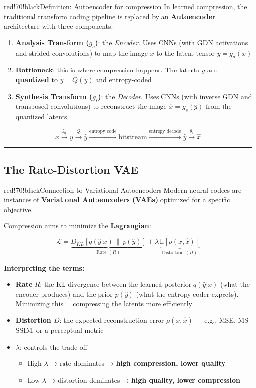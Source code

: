 \begin{calloutbox}{red!70!black}{Definition: Autoencoder for compression}
In learned compression, the traditional transform coding pipeline is replaced by an \textbf{Autoencoder} architecture with three components:

\begin{enumerate}
\item \textbf{Analysis Transform ($g_a$)}: the \textit{Encoder}. Uses CNNs (with GDN activations and strided convolutions) to map the image $x$ to the latent tensor $y = g_a(x)$
\item \textbf{Bottleneck}: this is where compression happens. The latents $y$ are \textbf{quantized} to $\hat{y} = Q(y)$ and entropy-coded
\item \textbf{Synthesis Transform ($g_s$)}: the \textit{Decoder}. Uses CNNs (with inverse GDN and transposed convolutions) to reconstruct the image $\hat{x} = g_s(\hat{y})$ from the quantized latents
\end{enumerate}
\end{calloutbox}

\[
x \xrightarrow{g_a} y \xrightarrow{Q} \hat{y} \xrightarrow{\text{entropy code}} \text{bitstream} \xrightarrow{\text{entropy decode}} \hat{y} \xrightarrow{g_s} \hat{x}
\]

\bigskip\hrule\bigskip

\subsection{The Rate-Distortion VAE}

\begin{calloutbox}{red!70!black}{Connection to Variational Autoencoders}
Modern neural codecs are instances of \textbf{Variational Autoencoders (VAEs)} optimized for a specific objective.

Compression aims to minimize the \textbf{Lagrangian}:

\[
\boxed{\mathcal{L} = \underbrace{D_{KL}[q(\hat{y}|x) \,\|\, p(\hat{y})]}_{\text{Rate }(R)} + \lambda\, \underbrace{\mathbb{E}[\rho(x, \hat{x})]}_{\text{Distortion }(D)}}
\]
\end{calloutbox}

\textbf{Interpreting the terms:}
\begin{itemize}
\item \textbf{Rate $R$}: the KL divergence between the learned posterior $q(\hat{y}|x)$ (what the encoder produces) and the prior $p(\hat{y})$ (what the entropy coder expects). Minimizing this = compressing the latents more efficiently
\item \textbf{Distortion $D$}: the expected reconstruction error $\rho(x, \hat{x})$ — e.g., MSE, MS-SSIM, or a perceptual metric
\item \textbf{$\lambda$}: controls the trade-off
\begin{itemize}
\item High $\lambda$ → rate dominates → \textbf{high compression, lower quality}
\item Low $\lambda$ → distortion dominates → \textbf{high quality, lower compression}
\end{itemize}
\end{itemize}

